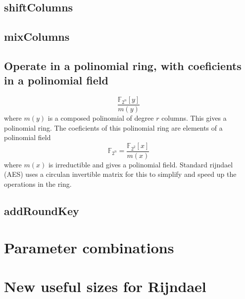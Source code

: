 \documentclass[a4paper,twoside]{llncs}
\newcommand{\Fpn}[2]{\ensuremath{\mathbb{F}_{#1^#2}}}
\newcommand{\Fpnm}[2]{\ensuremath{\frac{\Fpn{2}{#1}[#2]}{m(#2)}}}
\begin{document}

\subsection{shiftColumns}

\subsection{mixColumns}
\subsection{Operate in a polinomial ring, with coeficients in a polinomial field}
$$\Fpnm{n}{y}\label{eq:polinomialRing}$$ where $m(y)$ is a composed polinomial of degree $r$ columns. This gives a polinomial ring. The coeficients of this polinomial ring are elements of a polinomial field $$\Fpn{2}{n}=\Fpnm{2}{x}\label{eq:polinomialField}$$ where $m(x)$ is irreductible and gives a polinomial field.
Standard rijndael (AES) uses a circulan invertible matrix for this to simplify and speed up the operations in the ring.

\subsection{addRoundKey}

\section{Parameter combinations}

\section{New useful sizes for Rijndael}
\cite{Daemen:1999:EBC:1267115.1267119}
\end{document}
